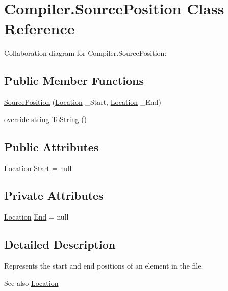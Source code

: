 \hypertarget{class_compiler_1_1_source_position}{}\section{Compiler.\+Source\+Position Class Reference}
\label{class_compiler_1_1_source_position}


Collaboration diagram for Compiler.\+Source\+Position\+:
\subsection*{Public Member Functions}
\begin{DoxyCompactItemize}
\item 
\mbox{\hyperlink{class_compiler_1_1_source_position_ac8eeb6d20c8a788dfe27345b435bb035}{Source\+Position}} (\mbox{\hyperlink{class_compiler_1_1_location}{Location}} \+\_\+\+Start, \mbox{\hyperlink{class_compiler_1_1_location}{Location}} \+\_\+\+End)
\item 
override string \mbox{\hyperlink{class_compiler_1_1_source_position_a95b14602e2629b906f29ef194d4f88f6}{To\+String}} ()
\end{DoxyCompactItemize}
\subsection*{Public Attributes}
\begin{DoxyCompactItemize}
\item 
\mbox{\hyperlink{class_compiler_1_1_location}{Location}} \mbox{\hyperlink{class_compiler_1_1_source_position_ad7c78fd184a393fc62cb5ee8678db0c8}{Start}} = null
\end{DoxyCompactItemize}
\subsection*{Private Attributes}
\begin{DoxyCompactItemize}
\item 
\mbox{\hyperlink{class_compiler_1_1_location}{Location}} \mbox{\hyperlink{class_compiler_1_1_source_position_af3d1f2d17f914b89789fff6207265829}{End}} = null
\end{DoxyCompactItemize}


\subsection{Detailed Description}
Represents the start and end positions of an element in the file. \begin{DoxySeeAlso}{See also}
\mbox{\hyperlink{class_compiler_1_1_location}{Location}} 
\end{DoxySeeAlso}


